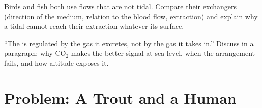 \begin{exercise}[$\star\star\star$]\label{exo:b1:gas-exchange:11}
Birds and fish both use flows that are not tidal. Compare their
exchangers (direction of the medium, relation to the blood flow,
extraction) and explain why a tidal  cannot reach their
extraction whatever its surface.
\end{exercise}

\begin{exercise}[$\star\star\star$]\label{exo:b1:gas-exchange:12}
``The  is regulated by the gas it excretes, not by the gas it
takes in.'' Discuss in a paragraph: why $\mathrm{CO_2}$ makes the better
signal at sea level, when the arrangement fails, and how altitude
exposes it.
\end{exercise}

\section{Problem: A Trout and a Human}

